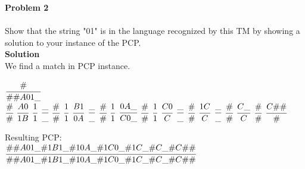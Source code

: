 \documentclass{article}
\newcommand{\domino}[2]{\left [ \cfrac{#1}{#2} \right ]}
\newcommand{\tile}[2]{\cfrac{#1}{#2}}
\newcommand{\problem}[1]{\large{\textbf{Problem #1}}\\}
\begin{document}
\pagebreak

\problem{2} \\
Show that the string "01" is in the language recognized by this TM by showing a solution to your instance of the PCP.\\

\textbf{Solution} \\
We find a match in PCP instance.
%
\vspace{1cm}

\begin{adjustbox}{width=1\textwidth,center}
$\tile{\#}{\#\#A01\_}$ \\
$\tile{\#}{\#}$
$\tile{A0}{1B}$
$\tile{1}{1}$
$\tile{\_}{\_}$
$\tile{\#}{\#}$
$\tile{1}{1}$
$\tile{B1}{0A}$
$\tile{\_}{\_}$
$\tile{\#}{\#}$
$\tile{1}{1}$
$\tile{0A\_}{C0\_}$
$\tile{\#}{\#}$
$\tile{1}{1}$
$\tile{C0}{C}$ 
$\tile{\_}{\_}$
$\tile{\#}{\#}$
$\tile{1C}{C}$ 
$\tile{\_}{\_}$
$\tile{\#}{\#}$
$\tile{C\_}{C}$
$\tile{\#}{\#}$
$\tile{C\#\#}{\#}$
\end{adjustbox}

\vspace{1cm}

Resulting PCP: \\

$\cfrac{\#\#A01\_\#1B1\_\#10A\_\#1C0\_\#1C\_\#C\_\#C\#\#}{\#\#A01\_\#1B1\_\#10A\_\#1C0\_\#1C\_\#C\_\#C\#\#}$
\end{document}
